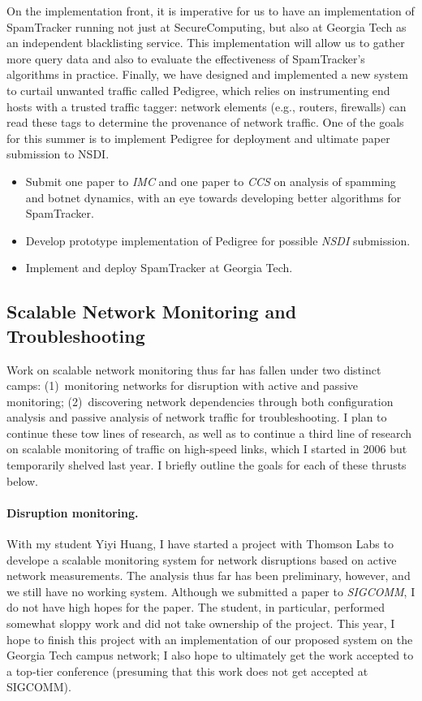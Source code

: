 \begin{sloppypar}
On the implementation front, it is imperative for us to have an
implementation of SpamTracker running not just at SecureComputing, but
also at Georgia Tech as an independent blacklisting service.  This
implementation will allow us to gather more query data and also to
evaluate the effectiveness of SpamTracker's algorithms in practice.
Finally, we have designed and implemented a new system to curtail
unwanted traffic called Pedigree, which relies on instrumenting end
hosts with a trusted traffic tagger: network elements (e.g., routers,
firewalls) can read these tags to determine the provenance of network
traffic.  One of the goals for this summer is to implement Pedigree for
deployment and ultimate paper submission to NSDI.

\begin{itemize}
\itemsep=-1pt
\item Submit one paper to {\em IMC} and one paper to {\em CCS} on
  analysis of spamming and botnet dynamics, with an eye towards
  developing better algorithms for SpamTracker.
\item Develop prototype implementation of Pedigree for possible {\em
  NSDI} submission.
\item Implement and deploy SpamTracker at Georgia Tech.
\end{itemize}


\subsection*{Scalable Network Monitoring and Troubleshooting}

Work on scalable network monitoring thus far has fallen under two
distinct camps: (1)~monitoring networks for disruption with active and
passive monitoring; (2)~discovering network dependencies through
both configuration analysis and passive analysis of network traffic for
troubleshooting.  I plan to continue these tow lines of research, as
well as to continue a third line of research on scalable monitoring of
traffic on high-speed links, which I started in 2006 but temporarily
shelved last year.  I briefly outline the goals for each of these
thrusts below.  

\paragraph{Disruption monitoring.}  With my student Yiyi Huang, I have
started a project with Thomson Labs to develope a scalable monitoring
system for network disruptions based on active network measurements.
The analysis thus far has been preliminary, however, and we still have
no working system.  Although we submitted a paper to {\em SIGCOMM}, I do
not have high hopes for the paper.  The student, in particular,
performed somewhat sloppy work and did not take ownership of the
project.  This year, I hope to finish this project with an
implementation of our proposed system on the Georgia Tech campus
network; I also hope to ultimately get the work accepted to a top-tier
conference (presuming that this work does not get accepted at SIGCOMM). 


\end{sloppypar}
